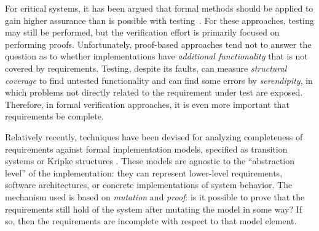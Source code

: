 

For critical systems, it has been argued that formal methods
should be applied to gain higher assurance than is possible with testing~\cite{Miller10:CACM,Rushby09:SEFM,Hardin09:Security}.  For these approaches, testing may still be performed, but the verification effort is primarily focused on performing proofs.  Unfortunately, proof-based approaches tend not to answer the question as to whether implementations have {\em additional functionality} that is not covered by requirements.  Testing, despite its faults, can measure {\em structural coverage} to find untested functionality and can find some errors by {\em serendipity}, in which problems not directly related to the requirement under test are exposed.  Therefore, in formal verification approaches, it is even more important that requirements be complete.

Relatively recently, techniques have been devised for analyzing completeness of requirements against formal implementation models, specified as transition systems or Kripke structures \cite{chockler2001practical,das2005formal, claessen2007coverage, grosse2007estimating}.  These models are agnostic to the ``abstraction level'' of the implementation: they can represent lower-level requirements, software architectures, or concrete implementations of system behavior.  The mechanism used is based on {\em mutation} and {\em proof}: is it possible to prove that the requirements still hold of the system after mutating the model in some way?  If so, then the requirements are incomplete with respect to that model element.

